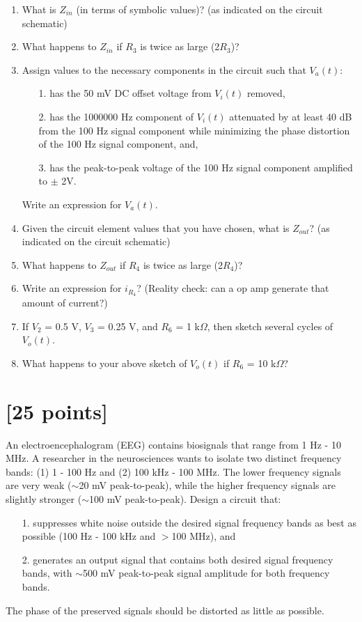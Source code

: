 \documentclass[12pt]{article}
\begin{document}
\begin{enumerate}
\item What is $Z_{in}$ (in terms of symbolic values)?  (as indicated on the circuit schematic)
\item What happens to $Z_{in}$ if $R_3$ is twice as large (2$R_3$)?
\item Assign values to the necessary components in the circuit such that $V_a(t)$:
\begin{enumerate}
\item[1.] has the 50 mV DC offset voltage from $V_i(t)$ removed, 
\item[2.] has the 1000000 Hz component of $V_i(t)$ attenuated by at least 40 dB from
the 100 Hz signal component while minimizing the phase distortion of the 100 Hz
signal component, and, 
\item[3.] has the peak-to-peak voltage of the 100 Hz signal component amplified to
$\pm$ 2V. 
\end{enumerate}
Write an expression for $V_a(t)$.
\item Given the circuit element values that you have chosen, what is $Z_{out}$?  (as indicated on the circuit schematic)
\item What happens to $Z_{out}$ if $R_4$ is twice as large (2$R_4$)?
\item Write an expression for $i_{R_4}$?  (Reality check: can a op amp generate that amount of current?)
\item If $V_2$ = 0.5 V, $V_3$ = 0.25 V, and $R_6$ = 1 k$\Omega$, then sketch
several cycles of $V_o(t)$.
\item What happens to your above sketch of $V_o(t)$ if $R_6$ = 10 k$\Omega$?
\end{enumerate}

\clearpage



\clearpage



\clearpage



\section{[25 points]}

An electroencephalogram (EEG) contains biosignals that range from 1 Hz - 10
MHz.  A researcher in the neurosciences wants to isolate two distinct frequency
bands: (1) 1 - 100 Hz and (2) 100 kHz - 100 MHz.  The lower frequency signals are
very weak ($\sim$20 mV peak-to-peak), while the higher frequency signals are
slightly stronger ($\sim$100 mV peak-to-peak).  Design a circuit that:
\begin{enumerate}
\item [1.] suppresses white noise outside the desired signal frequency bands as
best as possible (100 Hz - 100 kHz and $>$100 MHz), and 
\item [2.] generates an output signal that contains both desired signal
frequency bands, with $\sim$500 mV peak-to-peak signal amplitude for both
frequency bands.  
\end{enumerate}
The phase of the preserved signals should be distorted as little as possible.
\end{document}
